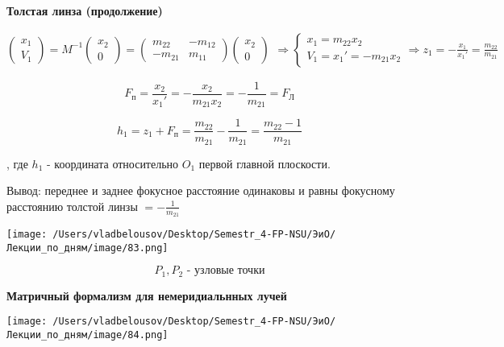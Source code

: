\documentclass[12pt, a4paper]{report}
\begin{document}
\fi


\textbf{Толстая линза (продолжение)} 

\[ \begin{pmatrix}
x_1 \\
V_1 
\end{pmatrix} = M^{-1 }
\begin{pmatrix}
    x_2 \\
    0 
\end{pmatrix} =
\begin{pmatrix}
m_{22} & -m_{12}\\
-m_{21} & m_{11}
\end{pmatrix}\begin{pmatrix}
    x_2\\
    0 
\end{pmatrix} 
\begin{aligned}
    \Rightarrow 
    \begin{cases}
        x_1= m_{22} x_2 \\
        V_1 = x_1 ' = - m_{21} x_2 
    \end{cases} 
    \Rightarrow
    z_1  =- \frac{x_1}{x_1' }= \frac{m_{22}}{m_{21}}  
\end{aligned}
\] 

\[ F_{\text{п} } = \frac{x_2}{x_1 '} = -\frac{x_2 }{m_{21}x_2 } = - \frac{1}{m_{21} } = F_{\text{Л} }    \] 

\[ h_1 = z_1 + F_{\text{п} } = \frac{m_{22}}{m_{21}} - \frac{1}{m_{21} } = \frac{m_{22} - 1 }{m_{21}}     \] 

, где \( h_1      \) - координата относительно \( O_1 \) первой главной плоскости.

Вывод: переднее и заднее фокусное расстояние одинаковы и равны  фокусному расстоянию толстой линзы \( = \displaystyle  - \frac{1}{m_{21}}  \) 

\begin{center}
    \texttt{[image: /Users/vladbelousov/Desktop/Semestr\_4-FP-NSU/ЭиО/Лекции\_по\_дням/image/83.png]}
\end{center} 
\[ P_1,P_2 \text{ - узловые точки}  \] 

\textbf{Матричный формализм для немеридиальнных лучей  } 

\begin{center}
    \texttt{[image: /Users/vladbelousov/Desktop/Semestr\_4-FP-NSU/ЭиО/Лекции\_по\_дням/image/84.png]}
\end{center}  
\end{document}
